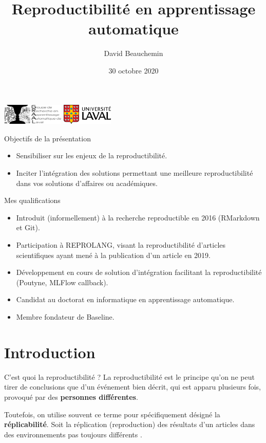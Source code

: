 \documentclass{beamer}
\title{Reproductibilité en apprentissage automatique}
\author[D. Beauchemin]{David Beauchemin}
\institute[Université Laval]
{
	Département d'informatique et de génie logiciel, \\
	Université Laval\\
	\medskip
	{\emph{david.beauchemin.5@ulaval.ca}}
}
\date{30 octobre 2020}
\begin{document}
	
	
	\begin{frame}[label=titre, plain]
		\titlepage
		\begin{center}
			\includegraphics[height=1cm]{graal}
			\includegraphics[height=1cm]{UL_P}
		\end{center}
	\end{frame}

	\begin{frame}{Objectifs de la présentation}
		\begin{itemize}
			\item Sensibiliser sur les enjeux de la reproductibilité.
			\item Inciter l'intégration des solutions permettant une meilleure reproductibilité dans vos solutions d'affaires ou académiques.
		\end{itemize}
	\end{frame}

	\begin{frame}{Mes qualifications}
		\begin{itemize}
			\item Introduit (informellement) à la recherche reproductible en 2016 (RMarkdown et Git).
			\item Participation à REPROLANG, visant la reproductibilité d'articles scientifiques ayant mené à la publication d'un article en 2019.
			\item Développement en cours de solution d'intégration facilitant la reproductibilité (Poutyne, MLFlow callback).
			\item Candidat au doctorat en informatique en apprentissage automatique.
			\item Membre fondateur de Baseline.
		\end{itemize}
	\end{frame}
	
	\section{Introduction}
	\begin{frame}{C'est quoi la reproductibilité ?}
		La reproductibilité est le principe qu'on ne peut tirer de conclusions que d'un événement bien décrit, qui est apparu plusieurs fois, provoqué par des \textbf{personnes différentes}.
		
		Toutefois, on utilise souvent ce terme pour spécifiquement désigné la \textbf{réplicabilité}. Soit la réplication (reproduction) des résultats d'un articles dans des environnements pas toujours différents \cite{replicationvsreproductiblity, pineau2020improving}.
	\end{frame}
\end{document}
